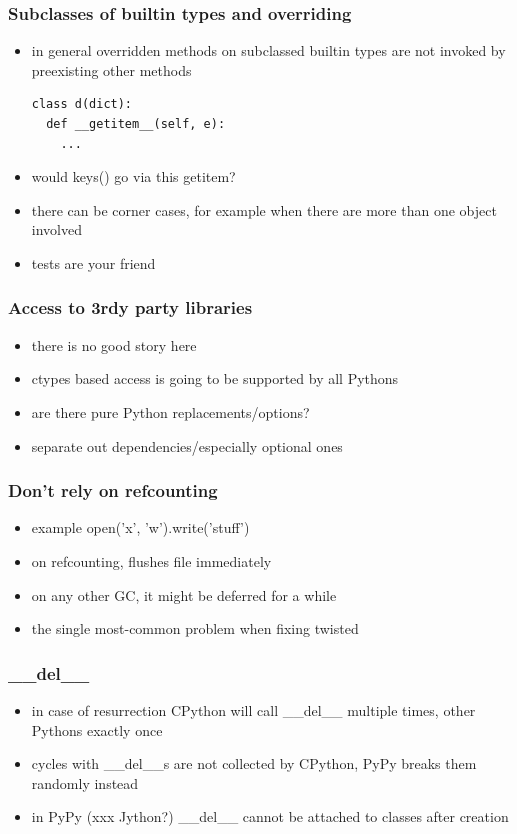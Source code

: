 \documentclass[utf8x, 14pt]{beamer}
\begin{document}
\begin{frame}[fragile]
  \frametitle{Subclasses of builtin types and overriding}
  \begin{itemize}
    \item in general overridden methods on subclassed builtin types are not 
      invoked by preexisting other methods
      \begin{verbatim}
class d(dict):
  def __getitem__(self, e):
    ...
      \end{verbatim}
    \item would {\ttfamily keys()} go via this getitem?
    \item there can be corner cases, for example when
      there are more than one object involved
    \item tests are your friend
  \end{itemize}
\end{frame}

\begin{frame}
  \frametitle{Access to 3rdy party libraries}
  \begin{itemize}
    \item there is no good story here
    \item ctypes based access is going to be supported by all Pythons
    \item are there pure Python replacements/options?
    \item separate out dependencies/especially optional ones
  \end{itemize}
\end{frame}

\begin{frame}
  \frametitle{Don't rely on refcounting}
  \begin{itemize}
    \item example {\ttfamily open('x', 'w').write('stuff')}
    \item on refcounting, flushes file immediately
    \item on any other GC, it might be deferred for
      a while
    \item the single most-common problem when fixing twisted
  \end{itemize}
\end{frame}

\begin{frame}
  \frametitle{\_\_del\_\_}
  \begin{itemize}
    \item in case of resurrection CPython will call {\ttfamily \_\_del\_\_} multiple times,
      other Pythons exactly once
    \item cycles with \_\_del\_\_s are not collected by CPython,
      PyPy breaks them randomly instead
    \item in PyPy (xxx Jython?) \_\_del\_\_ cannot be attached to classes after creation
  \end{itemize}
\end{frame}
\end{document}
